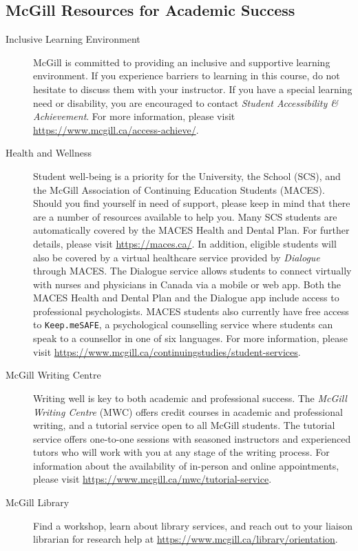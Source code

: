 \documentclass{article}
\begin{document}
\subsection{McGill Resources for Academic Success}

\begin{description}
\item[Inclusive Learning Environment]{McGill is committed to providing
  an inclusive and supportive learning environment. If you experience
  barriers to learning in this course, do not hesitate to discuss them
  with your instructor. If you have a special learning need or
  disability, you are encouraged to contact
{\em Student Accessibility \& Achievement}.
  For more information, please visit
  \url{https://www.mcgill.ca/access-achieve/}.}
  
\item[Health and Wellness]{Student well-being is a priority for the
  University, the School (SCS), and the McGill Association of
  Continuing Education Students (MACES). Should you find yourself in
  need of support, please keep in mind that there are a number of
  resources available to help you. Many SCS students are automatically
  covered by the MACES Health and Dental Plan. For further details,
  please visit \url{https://maces.ca/}. In addition, eligible students
  will also be covered by a virtual healthcare service provided by
  {\em Dialogue} through MACES. The Dialogue service allows students
  to connect virtually with nurses and physicians in Canada via a
  mobile or web app. Both the MACES Health and Dental Plan and the
  Dialogue app include access to professional psychologists. MACES
  students also currently have free access to \texttt{Keep.meSAFE}, a
  psychological counselling service where students can speak to a
  counsellor in one of six languages. For more information, please
  visit
  \url{https://www.mcgill.ca/continuingstudies/student-services}.}
\item[McGill Writing Centre]{Writing well is key to both academic and
  professional success. The {\em McGill Writing Centre} (MWC) offers
  credit courses in academic and professional writing, and a tutorial
  service open to all McGill students. The tutorial service offers
  one-to-one sessions with seasoned instructors and experienced tutors
  who will work with you at any stage of the writing process.  For
  information about the availability of in-person and online
  appointments, please visit
  \url{https://www.mcgill.ca/mwc/tutorial-service}.}
\item[McGill Library]{Find a workshop, learn about library services,
  and reach out to your liaison librarian for research help at
  \url{https://www.mcgill.ca/library/orientation}.}
\end{description}
\end{document}
